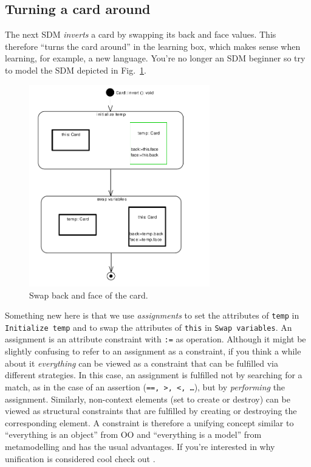 \subsection{Turning a card around} 

The next SDM \emph{inverts} a card by swapping its back and face values.  This
therefore ``turns the card around'' in the learning box, which makes sense when
learning, for example, a new language.  You're no longer an SDM beginner so try
to model the SDM depicted in Fig.~\ref{fig:sdm_invert}.

\begin{figure}[htp]
\begin{center}
  \includegraphics[width=0.7\textwidth]{pics/sdmBilder/invert/sdm54}
  \caption{Swap back and face of the card.}  
  \label{fig:sdm_invert}
\end{center}
\end{figure}

Something new here is that we use \emph{assignments} to set the attributes of
\texttt{temp} in \texttt{Initialize temp} and to swap the attributes of
\texttt{this} in \texttt{Swap variables}.  An assignment is an attribute
constraint with \texttt{:=} as operation.  Although it might be slightly
confusing to refer to an assignment as a constraint, if you think a while about
it \emph{everything} can be viewed as a constraint that can be fulfilled via
different strategies.  In this case, an assignment is fulfilled not by searching
for a match, as in the case of an assertion (\texttt{==, >, <, \ldots}), but by
\emph{performing} the assignment.  Similarly, non-context elements (set to
create or destroy) can be viewed as structural constraints that are fulfilled by
creating or destroying the corresponding element.  A constraint is therefore
a unifying concept similar to ``everything is an object'' from OO and
``everything is a model'' from metamodelling and has the usual advantages.  If
you're interested in why unification is considered cool check out \cite{BEZ05}.

